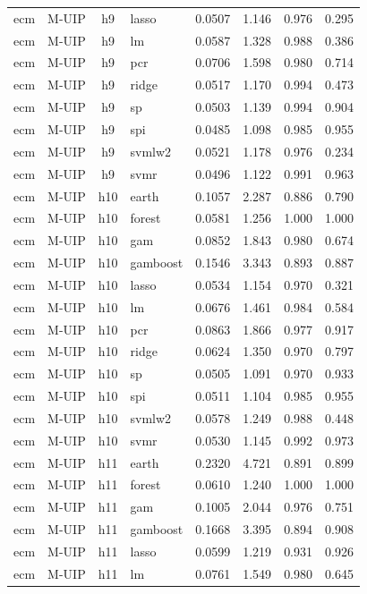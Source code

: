 \begin{ThreePartTable}
\begin{longtable}[t]{llclcccc}
ecm & M-UIP & h9 & lasso & 0.0507 & 1.146 & 0.976 & 0.295\\
ecm & M-UIP & h9 & lm & 0.0587 & 1.328 & 0.988 & 0.386\\
ecm & M-UIP & h9 & pcr & 0.0706 & 1.598 & 0.980 & 0.714\\
ecm & M-UIP & h9 & ridge & 0.0517 & 1.170 & 0.994 & 0.473\\
ecm & M-UIP & h9 & sp & 0.0503 & 1.139 & 0.994 & 0.904\\
ecm & M-UIP & h9 & spi & 0.0485 & 1.098 & 0.985 & 0.955\\
ecm & M-UIP & h9 & svmlw2 & 0.0521 & 1.178 & 0.976 & 0.234\\
ecm & M-UIP & h9 & svmr & 0.0496 & 1.122 & 0.991 & 0.963\\
\addlinespace
ecm & M-UIP & h10 & earth & 0.1057 & 2.287 & 0.886 & 0.790\\
ecm & M-UIP & h10 & forest & 0.0581 & 1.256 & 1.000 & 1.000\\
ecm & M-UIP & h10 & gam & 0.0852 & 1.843 & 0.980 & 0.674\\
ecm & M-UIP & h10 & gamboost & 0.1546 & 3.343 & 0.893 & 0.887\\
ecm & M-UIP & h10 & lasso & 0.0534 & 1.154 & 0.970 & 0.321\\
ecm & M-UIP & h10 & lm & 0.0676 & 1.461 & 0.984 & 0.584\\
ecm & M-UIP & h10 & pcr & 0.0863 & 1.866 & 0.977 & 0.917\\
ecm & M-UIP & h10 & ridge & 0.0624 & 1.350 & 0.970 & 0.797\\
ecm & M-UIP & h10 & sp & 0.0505 & 1.091 & 0.970 & 0.933\\
ecm & M-UIP & h10 & spi & 0.0511 & 1.104 & 0.985 & 0.955\\
ecm & M-UIP & h10 & svmlw2 & 0.0578 & 1.249 & 0.988 & 0.448\\
ecm & M-UIP & h10 & svmr & 0.0530 & 1.145 & 0.992 & 0.973\\
\addlinespace
ecm & M-UIP & h11 & earth & 0.2320 & 4.721 & 0.891 & 0.899\\
ecm & M-UIP & h11 & forest & 0.0610 & 1.240 & 1.000 & 1.000\\
ecm & M-UIP & h11 & gam & 0.1005 & 2.044 & 0.976 & 0.751\\
ecm & M-UIP & h11 & gamboost & 0.1668 & 3.395 & 0.894 & 0.908\\
ecm & M-UIP & h11 & lasso & 0.0599 & 1.219 & 0.931 & 0.926\\
ecm & M-UIP & h11 & lm & 0.0761 & 1.549 & 0.980 & 0.645\\

\end{longtable}
\end{ThreePartTable}
